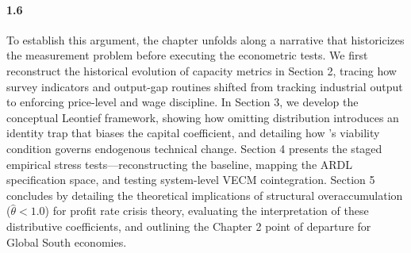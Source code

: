 \paragraph{1.6}
To establish this argument, the chapter unfolds along a narrative that historicizes the measurement problem before executing the econometric tests. We first reconstruct the historical evolution of capacity metrics in Section 2, tracing how survey indicators and output-gap routines shifted from tracking industrial output to enforcing price-level and wage discipline. In Section 3, we develop the conceptual Leontief framework, showing how omitting distribution introduces an identity trap that biases the capital coefficient, and detailing how \citet{Basu2022}'s viability condition governs endogenous technical change. Section 4 presents the staged empirical stress tests—reconstructing the baseline, mapping the ARDL specification space, and testing system-level VECM cointegration. Section 5 concludes by detailing the theoretical implications of structural overaccumulation ($\hat{\theta} < 1.0$) for profit rate crisis theory, evaluating the interpretation of these distributive coefficients, and outlining the Chapter 2 point of departure for Global South economies.
